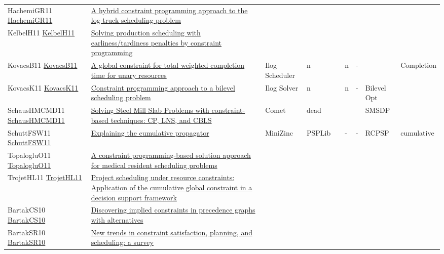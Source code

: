 {\begin{longtable}{p{3cm}p{7cm}lllllll}
HachemiGR11 \href{https://doi.org/10.1007/s10479-010-0698-x}{HachemiGR11} &  \href{articles/HachemiGR11.pdf}{A hybrid constraint programming approach to the log-truck scheduling problem} &  &  &  &  &  &  & \\
KelbelH11 \href{https://doi.org/10.1007/s10845-009-0318-2}{KelbelH11} &  \href{articles/KelbelH11.pdf}{Solving production scheduling with earliness/tardiness penalties by constraint programming} &  &  &  &  &  &  & \\
KovacsB11 \href{https://doi.org/10.1007/s10601-009-9088-x}{KovacsB11} &  \href{articles/KovacsB11.pdf}{A global constraint for total weighted completion time for unary resources} & Ilog Scheduler & n &  & n & - &  & Completion\\
KovacsK11 \href{https://doi.org/10.1007/s10601-010-9102-3}{KovacsK11} &  \href{articles/KovacsK11.pdf}{Constraint programming approach to a bilevel scheduling problem} & Ilog Solver & n &  & n & - & Bilevel Opt & \\
SchausHMCMD11 \href{https://doi.org/10.1007/s10601-010-9100-5}{SchausHMCMD11} &  \href{articles/SchausHMCMD11.pdf}{Solving Steel Mill Slab Problems with constraint-based techniques: CP, LNS, and {CBLS}} & Comet & dead &  &  &  & SMSDP & \\
SchuttFSW11 \href{https://doi.org/10.1007/s10601-010-9103-2}{SchuttFSW11} &  \href{articles/SchuttFSW11.pdf}{Explaining the cumulative propagator} & MiniZinc & PSPLib &  & - & - & RCPSP & cumulative\\
TopalogluO11 \href{https://doi.org/10.1016/j.cor.2010.04.018}{TopalogluO11} &  \href{articles/TopalogluO11.pdf}{A constraint programming-based solution approach for medical resident scheduling problems} &  &  &  &  &  &  & \\
TrojetHL11 \href{https://doi.org/10.1016/j.cie.2010.08.014}{TrojetHL11} &  \href{articles/TrojetHL11.pdf}{Project scheduling under resource constraints: Application of the cumulative global constraint in a decision support framework} &  &  &  &  &  &  & \\
BartakCS10 \href{https://doi.org/10.1007/s10479-008-0492-1}{BartakCS10} &  \href{articles/BartakCS10.pdf}{Discovering implied constraints in precedence graphs with alternatives} &  &  &  &  &  &  & \\
BartakSR10 \href{https://doi.org/10.1017/S0269888910000202}{BartakSR10} &  \href{articles/BartakSR10.pdf}{New trends in constraint satisfaction, planning, and scheduling: a survey} &  &  &  &  &  &  & \\

\end{longtable}}
